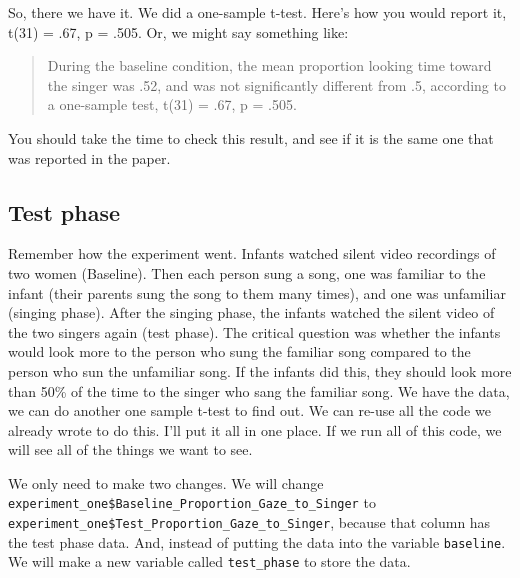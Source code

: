 \documentclass[
]{book}
\newenvironment{Shaded}{\begin{snugshade}}{\end{snugshade}}
\newcommand{\FunctionTok}[1]{\textcolor[rgb]{0.13,0.29,0.53}{\textbf{#1}}}
\newcommand{\NormalTok}[1]{#1}
\newcommand{\OtherTok}[1]{\textcolor[rgb]{0.56,0.35,0.01}{#1}}
\newcommand{\SpecialCharTok}[1]{\textcolor[rgb]{0.81,0.36,0.00}{\textbf{#1}}}
\begin{document}
So, there we have it. We did a one-sample t-test. Here's how you would report it, t(31) = .67, p = .505. Or, we might say something like:

\begin{quote}
During the baseline condition, the mean proportion looking time toward the singer was .52, and was not significantly different from .5, according to a one-sample test, t(31) = .67, p = .505.
\end{quote}

You should take the time to check this result, and see if it is the same one that was reported in the paper.

\hypertarget{test-phase}{%
\subsection{Test phase}\label{test-phase}}

Remember how the experiment went. Infants watched silent video recordings of two women (Baseline). Then each person sung a song, one was familiar to the infant (their parents sung the song to them many times), and one was unfamiliar (singing phase). After the singing phase, the infants watched the silent video of the two singers again (test phase). The critical question was whether the infants would look more to the person who sung the familiar song compared to the person who sun the unfamiliar song. If the infants did this, they should look more than 50\% of the time to the singer who sang the familiar song. We have the data, we can do another one sample t-test to find out. We can re-use all the code we already wrote to do this. I'll put it all in one place. If we run all of this code, we will see all of the things we want to see.

We only need to make two changes. We will change \texttt{experiment\_one\$Baseline\_Proportion\_Gaze\_to\_Singer} to \texttt{experiment\_one\$Test\_Proportion\_Gaze\_to\_Singer}, because that column has the test phase data. And, instead of putting the data into the variable \texttt{baseline}. We will make a new variable called \texttt{test\_phase} to store the data.

\begin{Shaded}
\end{Shaded}
\end{document}

